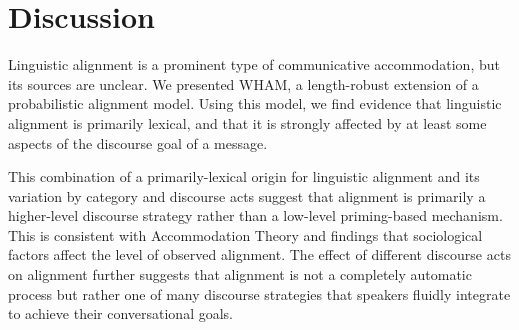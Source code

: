 \documentclass[11pt]{article}
\begin{document}
\section{Discussion}
Linguistic alignment is a prominent type of communicative accommodation, but its sources are unclear.  We presented WHAM, a length-robust extension of a probabilistic alignment model. Using this model, we find evidence that linguistic alignment is primarily lexical, and that it is strongly affected by at least some aspects of the discourse goal of a message.

This combination of a primarily-lexical origin for linguistic alignment and its variation by category and discourse acts suggest that alignment is primarily a higher-level discourse strategy rather than a low-level priming-based mechanism.  This is consistent with Accommodation Theory and findings that sociological factors affect the level of observed alignment.  The effect of different discourse acts on alignment further suggests that alignment is not a completely automatic process but rather one of many discourse strategies that speakers fluidly integrate to achieve their conversational goals.






%

%
%
\newpage


\end{document}
